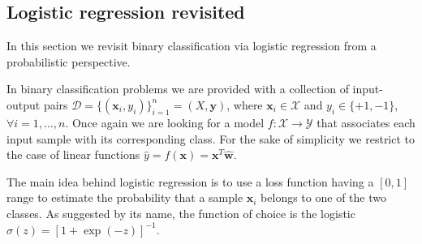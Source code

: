 %
%
%
%


\subsection{Logistic regression revisited} \label{subsec:logistic_regression_revisited}

In this section we revisit binary classification via logistic regression from a probabilistic perspective.

In binary classification problems we are provided with a collection of input-output pairs $\mathcal{D}=\{(\bm{x}_i, y_i)\}_{i=1}^n = (X, \bm{y})$, where $\bm{x}_i \in \mathcal{X}$ and $y_i \in \{+1,-1\}$, $\forall i=1,\dots,n$.
Once again we are looking for a model $f: \mathcal{X} \rightarrow \mathcal{Y}$ that associates each input sample with its corresponding class. For the sake of simplicity we restrict to the case of linear functions $\hat y = f(\bm{x}) = \bm{x}^T\bm{\hat w}$.

The main idea behind logistic regression is to use a loss function having a $[0,1]$ range to estimate the probability that a sample $\bm{x}_i$ belongs to one of the two classes. As suggested by its name, the function of choice is the logistic $\sigma(z) = [1+\exp{(-z)}]^{-1}$.

